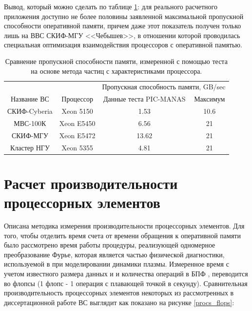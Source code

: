 Вывод, который можно сделать по таблице \ref{PIC_vs_PROC_RAM}: для реального расчетного приложения доступно не более половины заявленной максимальной пропускной способности оперативной памяти, причем даже этот показатель получен только лишь на ВВС СКИФ-МГУ <<Чебышев>>, в отношении которой проводилась специальная оптимизация взаимодействия процессоров с оперативной памятью.

\begin{table}[ht]
\caption{Сравнение пропускной способности памяти, измеренной с помощью теста на основе метода частиц с характеристиками процессора.}
\label{PIC_vs_PROC_RAM}
\begin{tabular}{|c|c|c|c|}
	\hline
             &            & \multicolumn{2}{|c|}{Пропускная способность памяти, GB/sec} \\ \cline{3-4}  	
Название ВС  & Процессор  & Данные теста PIC-MANAS & Максимум \\ \hline
СКИФ-Cyberia & Xeon 5150  &     1.53           & 10.6     \\ \hline
МВС-100К     & Xeon E5450 &     6.56           & 21       \\ \hline 
СКИФ-МГУ     & Xeon E5472 &     13.62          & 21       \\ \hline     
Кластер НГУ  & Xeon 5355  &     4.81           & 21       \\ \hline
\end{tabular}	
\end{table}

\section{Расчет производительности процессорных элементов}
\label{calc_PE}
Описана методика измерения производительности процессорных элементов.
Для того, чтобы отделить время счета от времени обращения к оперативной памяти было рассмотрено время работы процедуры,
реализующей одномерное преобразование Фурье, которая является частью физической диагностики, используемой в при моделировании динамики плазмы. Измеренное время с учетом известного размера данных и и количества операций в БПФ , переводится во флопсы (1 флопс - 1 операция с плавающей точкой в секунду). Сравнительная производительность процессорных элементов некоторых из рассмотренных в диссертационной работе ВС выглядит как показано на рисунке  \ref{procs_flops}:

